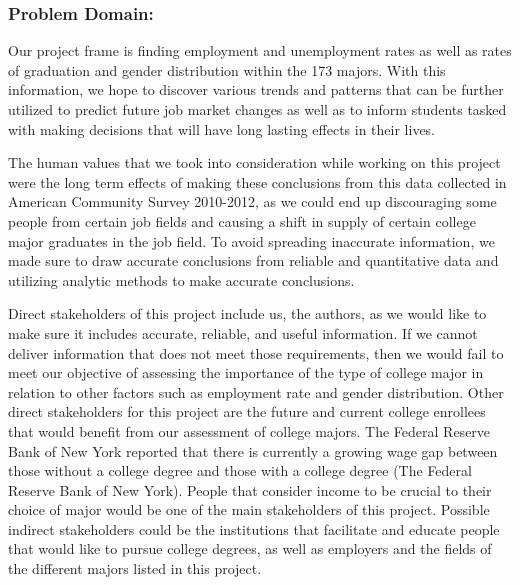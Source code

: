 \documentclass[
]{article}
\begin{document}
\hypertarget{problem-domain}{%
\subsubsection{Problem Domain:}\label{problem-domain}}

Our project frame is finding employment and unemployment rates as well
as rates of graduation and gender distribution within the 173 majors.
With this information, we hope to discover various trends and patterns
that can be further utilized to predict future job market changes as
well as to inform students tasked with making decisions that will have
long lasting effects in their lives.

The human values that we took into consideration while working on this
project were the long term effects of making these conclusions from this
data collected in American Community Survey 2010-2012, as we could end
up discouraging some people from certain job fields and causing a shift
in supply of certain college major graduates in the job field. To avoid
spreading inaccurate information, we made sure to draw accurate
conclusions from reliable and quantitative data and utilizing analytic
methods to make accurate conclusions.

Direct stakeholders of this project include us, the authors, as we would
like to make sure it includes accurate, reliable, and useful
information. If we cannot deliver information that does not meet those
requirements, then we would fail to meet our objective of assessing the
importance of the type of college major in relation to other factors
such as employment rate and gender distribution. Other direct
stakeholders for this project are the future and current college
enrollees that would benefit from our assessment of college majors. The
Federal Reserve Bank of New York reported that there is currently a
growing wage gap between those without a college degree and those with a
college degree (The Federal Reserve Bank of New York). People that
consider income to be crucial to their choice of major would be one of
the main stakeholders of this project. Possible indirect stakeholders
could be the institutions that facilitate and educate people that would
like to pursue college degrees, as well as employers and the fields of
the different majors listed in this project.
\end{document}
